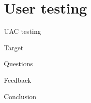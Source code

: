 
\section{User testing}\label{sec:user-testing}

UAC testing

Target

Questions

Feedback

Conclusion